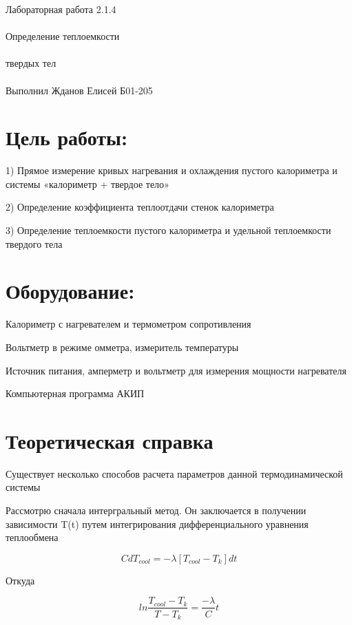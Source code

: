 \documentclass{astroedu-lab}
\begin{document}
\pagestyle{plain}

\begin{problem}{\huge Лабораторная работа 2.1.4\\\\Определение теплоемкости\\\\твердых тел\\\\Выполнил Жданов Елисей Б01-205}

\section{Цель работы:}

1) Прямое измерение кривых нагревания и охлаждения пустого калориметра и системы «калориметр + твердое тело»
 
2) Определение коэффициента теплоотдачи стенок калориметра

3) Определение теплоемкости пустого калориметра и удельной теплоемкости твердого тела

\section{Оборудование:}

Калориметр с нагревателем и термометром сопротивления

Вольтметр в режиме омметра, измеритель температуры

Источник питания, амперметр и вольтметр для измерения мощности нагревателя

Компьютерная программа АКИП

\section{Теоретическая справка}

Существует несколько способов расчета параметров данной термодинамической системы

Рассмотрю сначала интергральный метод. Он заключается в получении зависимости T(t) путем интегрирования дифференциального уравнения теплообмена

\begin{equation}
	C dT_{cool} = -\lambda [T_{cool} - T_k] dt
\end{equation}

Откуда

\begin{equation}
	\boxed{ln \frac{T_{cool} - T_k}{T - T_k} = \frac{-\lambda}{C} t}
\end{equation}


\end{problem}
\end{document}
